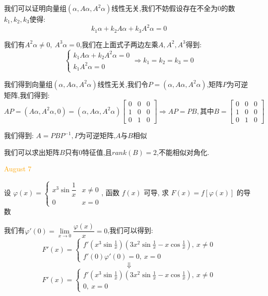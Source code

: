 \begin{solution}

	我们可以证明向量组$(\alpha,A\alpha,A^2\alpha)$线性无关,我们不妨假设存在不全为$0$的数$k_{1},k_{2},k_{3}$使得:  
	$$k_{1}\alpha+k_{2}A\alpha+k_{3}A^2\alpha=0$$
	
	我们有$A^2\alpha\neq 0,\ A^3\alpha=0$,我们在上面式子两边左乘$A,A^2,A^3$得到:  
	$$\left\lbrace
	\begin{array}{l}
		k_{1}A\alpha+k_{2}A^2\alpha=0\\
		k_{1}A^2\alpha=0
	\end{array}
	\right. \Rightarrow k_{1}=k_{2}=k_{3}=0$$
	
	我们得到向量组$(\alpha,A\alpha,A^2\alpha)$线性无关,我们令$P=(\alpha,A\alpha,A^2\alpha)$,矩阵$P$为可逆矩阵,我们得到:  
	$$AP=(A\alpha,A^2\alpha,0)=(\alpha,A\alpha,A^2\alpha)\left[ \begin{matrix}
		0&0&0\\1&0&0\\0&1&0
	\end{matrix}\right] \Rightarrow AP=PB,\text{其中}B=\left[ \begin{matrix}
	0&0&0\\1&0&0\\0&1&0
\end{matrix}\right] $$

我们得到:  $A=PBP^{-1},P\text{为可逆矩阵}$,$A$与$B$相似

我们可以求出矩阵$B$只有$0$特征值,且$rank(B)=2$,不能相似对角化.
\end{solution}


\textcolor{orange}{August 7}

\begin{example}[][Exam: 34.1.13]
	设 $\varphi(x)=
	\begin{cases}
		x^3\sin\dfrac{1}{x} & x\neq 0\\
		0 & x=0
	\end{cases}$, 函数 $f(x)$ 可导, 求 $F(x)=f[\varphi(x)]$ 的导数
\end{example}

\begin{solution}

	我们有$\varphi'(0)=\lim\limits_{x\to 0}\dfrac{\varphi(x)}{x}=0$,我们可以得到:  
	$$F'(x)=\left\lbrace
	\begin{array}{l}
		f'(x^3\sin\frac{1}{x})(3x^2\sin\frac{1}{x}-x\cos\frac{1}{x}),\ x\neq 0\\
		f'(0)\varphi'(0)=0,\ x=0
	\end{array}
	\right.$$
	$$\Downarrow$$ 
	$$ F'(x)=\left\lbrace
	\begin{array}{l}
		f'(x^3\sin\frac{1}{x})(3x^2\sin\frac{1}{x}-x\cos\frac{1}{x}),\ x\neq 0\\
		0,\ x=0
	\end{array}
	\right. $$
\end{solution}

